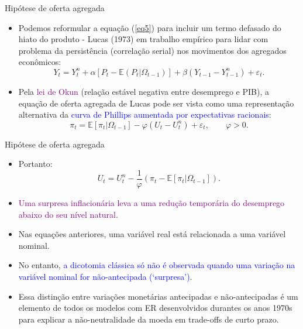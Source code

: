 \documentclass[10pt]{beamer}
\begin{document}
\begin{frame}{Hipótese de oferta agregada}
    \begin{itemize}
        \item Podemos reformular a equação (\ref{eq5}) para incluir um termo defasado do hiato do produto - Lucas (1973) em trabalho empírico para lidar com problema da persistência (correlação serial) nos movimentos dos agregados econômicos:
        \begin{equation}
            Y_t = Y_t^n + \alpha[P_t - \mathbb{E}(P_t|\Omega_{t-1})] + \beta(Y_{t-1}-Y_{t-1}^n) + \varepsilon_t.
            \label{eq6}
        \end{equation}
        \bigskip
        \item Pela \textcolor{purple}{lei de Okun} (relação estável negativa entre desemprego e PIB), a equação de oferta agregada de Lucas pode ser vista como uma representação alternativa da \textcolor{blue}{curva de Phillips aumentada por expectativas racionais}:
        \begin{equation}
            \pi_t = \mathbb{E}[\pi_t|\Omega_{t-1}] - \varphi(U_t - U_t^n) + \varepsilon_t, \qquad \varphi > 0.
            \label{eq7}
        \end{equation}
    \end{itemize}
\end{frame}

\begin{frame}{Hipótese de oferta agregada}
    \begin{itemize}
        \item Portanto:
        \begin{equation}
            U_t = U_t^n - \frac{1}{\varphi}(\pi_t - \mathbb{E}[\pi_t|\Omega_{t-1}]).
            \label{eq8}
        \end{equation}
        \bigskip
        \item \textcolor{purple}{Uma surpresa inflacionária leva a uma redução temporária do desemprego abaixo do seu nível natural}.
        \bigskip
        \item Nas equações anteriores, uma variável real está relacionada a uma variável nominal.
        \bigskip
        \item No entanto, \textcolor{blue}{a dicotomia clássica só não é observada quando uma variação na variável nominal for não-antecipada (`surpresa')}.
        \bigskip
        \item Essa distinção entre variações monetárias antecipadas e não-antecipadas é um elemento de todos os modelos com ER desenvolvidos durantes os anos 1970s para explicar a não-neutralidade da moeda em trade-offs de curto prazo.
    \end{itemize}
\end{frame}
\end{document}
